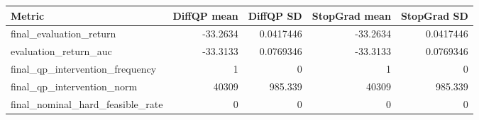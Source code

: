 \begin{tabular}{lrrrr}
\toprule
Metric & DiffQP mean & DiffQP SD & StopGrad mean & StopGrad SD \\
\midrule
final\_evaluation\_return & -33.2634 & 0.0417446 & -33.2634 & 0.0417446 \\
evaluation\_return\_auc & -33.3133 & 0.0769346 & -33.3133 & 0.0769346 \\
final\_qp\_intervention\_frequency & 1 & 0 & 1 & 0 \\
final\_qp\_intervention\_norm & 40309 & 985.339 & 40309 & 985.339 \\
final\_nominal\_hard\_feasible\_rate & 0 & 0 & 0 & 0 \\
\bottomrule
\end{tabular}
